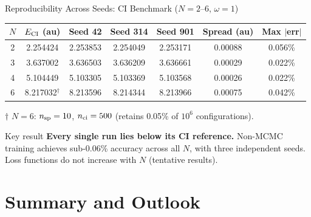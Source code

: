 \documentclass[aspectratio=169,10pt]{beamer}
\begin{document}
\begin{frame}{Reproducibility Across Seeds: CI Benchmark ($N=2$--$6$, $\omega=1$)}
  \begin{center}
    \renewcommand{\arraystretch}{1.30}
    \small
    \begin{tabular}{c|c|ccc|cc}
      \toprule
      $N$ & $E_{\rm CI}$ (au) &
      Seed 42 & Seed 314 & Seed 901 &
      Spread (au) & Max $|$err$|$ \\
      \midrule
      2 & 2.254424 &
        2.253853 & 2.254049 & 2.253171 &
        0.00088 & 0.056\% \\
      3 & 3.637002 &
        3.636503 & 3.636209 & 3.636661 &
        0.00029 & 0.022\% \\
      4 & 5.104449 &
        5.103305 & 5.103369 & 5.103568 &
        0.00026 & 0.022\% \\
      6 & 8.217032$^\dagger$ &
        8.213596 & 8.214344 & 8.213966 &
        0.00075 & 0.042\% \\
      \bottomrule
    \end{tabular}
    \normalsize
  \end{center}
  \vspace{0.15cm}
  \small$\dagger$ $N=6$: $n_{\rm sp}=10$, $n_{\rm ci}=500$ (retains 0.05\% of $10^6$ configurations).\normalsize

  \vspace{0.2cm}
  \begin{alertblock}{Key result}
    \textbf{Every single run lies below its CI reference.}
    Non-MCMC training achieves sub-0.06\% accuracy across all $N$,
    with three independent seeds. Loss functions do not increase with $N$ (tentative results).
  \end{alertblock}
\end{frame}


\section{Summary and Outlook}
\end{document}
